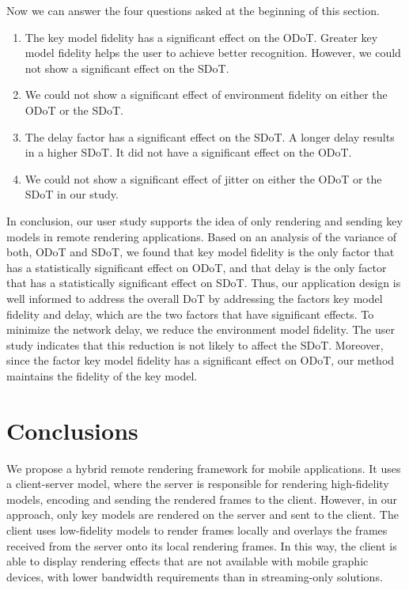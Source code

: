 Now we can answer the four questions asked at the beginning of this section.
\begin{enumerate}
\item
The key model fidelity has a significant effect on the ODoT. Greater key model fidelity helps the user to achieve better recognition. However, we could not show a significant effect on the SDoT. 
\item
We could not show a significant effect of  environment fidelity on either the ODoT or the SDoT.
\item
The delay factor has a significant effect on the SDoT. A longer delay results in a higher SDoT. It did not have a significant effect on the ODoT.
\item
We could not show a significant effect of jitter on either the ODoT or the SDoT in our study.
\end{enumerate}

In conclusion, our user study supports the idea of only rendering and sending key models in remote rendering applications.
Based on an analysis of the variance of both, ODoT and SDoT, we found that key model fidelity is the only factor that has a statistically significant effect on ODoT, and that delay is the only factor that has a statistically significant effect on SDoT.
Thus, our application design is well informed to address the overall DoT by addressing the factors key model fidelity and delay, which are the two factors that have significant effects.
To minimize the network delay, we reduce the environment model fidelity. The user study indicates that this reduction is not likely to affect the SDoT.
Moreover, since the factor key model fidelity has a significant effect on ODoT, our method maintains the fidelity of the key model.

\section{Conclusions}
\label{sec:hrr:c}

We propose a hybrid remote rendering framework for mobile applications.
It uses a client-server model, where the server is responsible for rendering high-fidelity models, encoding and sending the rendered frames to the client. However, in our approach, only key models are rendered on the server and sent to the client. The client uses low-fidelity models to render frames locally and overlays the frames received from the server onto its local rendering frames.
In this way, the client is able to display rendering effects that are not available with mobile graphic devices, with lower bandwidth requirements than in streaming-only solutions.


